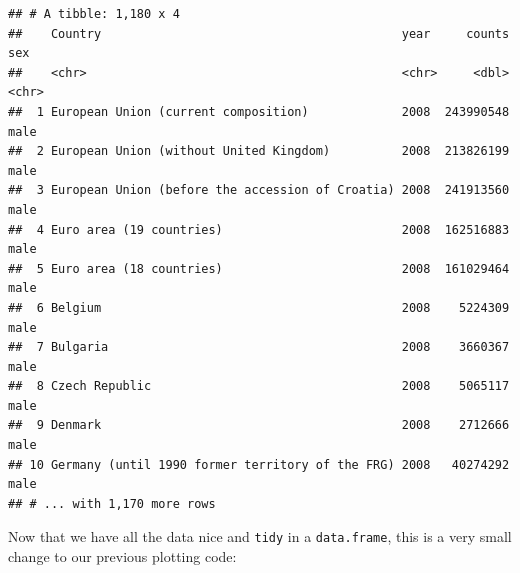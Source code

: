 \documentclass[]{book}
\newenvironment{Shaded}{\begin{snugshade}}{\end{snugshade}}
\newcommand{\KeywordTok}[1]{\textcolor[rgb]{0.13,0.29,0.53}{\textbf{#1}}}
\newcommand{\DataTypeTok}[1]{\textcolor[rgb]{0.13,0.29,0.53}{#1}}
\newcommand{\FloatTok}[1]{\textcolor[rgb]{0.00,0.00,0.81}{#1}}
\newcommand{\StringTok}[1]{\textcolor[rgb]{0.31,0.60,0.02}{#1}}
\newcommand{\CommentTok}[1]{\textcolor[rgb]{0.56,0.35,0.01}{\textit{#1}}}
\newcommand{\OperatorTok}[1]{\textcolor[rgb]{0.81,0.36,0.00}{\textbf{#1}}}
\newcommand{\NormalTok}[1]{#1}
\theoremstyle{definition}
\theoremstyle{definition}
\theoremstyle{definition}
\theoremstyle{remark}
\begin{document}
\begin{Shaded}
\end{Shaded}

\begin{verbatim}
## # A tibble: 1,180 x 4
##    Country                                          year     counts sex  
##    <chr>                                            <chr>     <dbl> <chr>
##  1 European Union (current composition)             2008  243990548 male 
##  2 European Union (without United Kingdom)          2008  213826199 male 
##  3 European Union (before the accession of Croatia) 2008  241913560 male 
##  4 Euro area (19 countries)                         2008  162516883 male 
##  5 Euro area (18 countries)                         2008  161029464 male 
##  6 Belgium                                          2008    5224309 male 
##  7 Bulgaria                                         2008    3660367 male 
##  8 Czech Republic                                   2008    5065117 male 
##  9 Denmark                                          2008    2712666 male 
## 10 Germany (until 1990 former territory of the FRG) 2008   40274292 male 
## # ... with 1,170 more rows
\end{verbatim}

Now that we have all the data nice and \texttt{tidy} in a
\texttt{data.frame}, this is a very small change to our previous
plotting code:

\begin{Shaded}
\end{Shaded}
\end{document}
